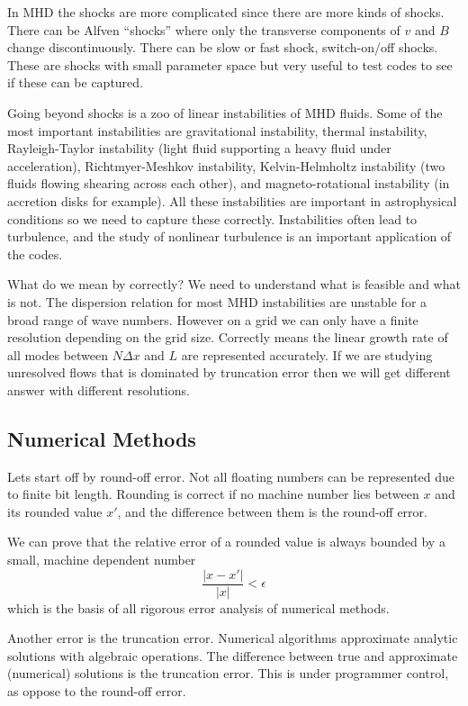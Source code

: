 \documentclass[letterpaper, 11pt]{article}
\numberwithin{equation}{section}
\numberwithin{figure}{section}
\begin{document}
In MHD the shocks are more complicated since there are more kinds of shocks.
There can be Alfven ``shocks'' where only the transverse components of $v$ and
$B$ change discontinuously. There can be slow or fast shock, switch-on/off
shocks. These are shocks with small parameter space but very useful to test
codes to see if these can be captured.

Going beyond shocks is a zoo of linear instabilities of MHD fluids. Some of the
most important instabilities are gravitational instability, thermal instability,
Rayleigh-Taylor instability (light fluid supporting a heavy fluid under
acceleration), Richtmyer-Meshkov instability, Kelvin-Helmholtz instability (two
fluids flowing shearing across each other), and magneto-rotational instability
(in accretion disks for example). All these instabilities are important in
astrophysical conditions so we need to capture these correctly. Instabilities
often lead to turbulence, and the study of nonlinear turbulence is an important
application of the codes.

What do we mean by correctly? We need to understand what is feasible and what is
not. The dispersion relation for most MHD instabilities are unstable for a broad
range of wave numbers. However on a grid we can only have a finite resolution
depending on the grid size. Correctly means the linear growth rate of all modes
between $N\Delta x$ and $L$ are represented accurately. If we are studying
unresolved flows that is dominated by truncation error then we will get
different answer with different resolutions.

\subsection{Numerical Methods}

Lets start off by round-off error. Not all floating numbers can be represented
due to finite bit length. Rounding is correct if no machine number lies between
$x$ and its rounded value $x'$, and the difference between them is the round-off
error.

We can prove that the relative error of a rounded value is always bounded by a
small, machine dependent number
\begin{equation}
  \label{eq:6}
  \frac{|x - x'|}{|x|} < \epsilon
\end{equation}
which is the basis of all rigorous error analysis of numerical methods.

Another error is the truncation error. Numerical algorithms approximate analytic
solutions with algebraic operations. The difference between true and approximate
(numerical) solutions is the truncation error. This is under programmer control,
as oppose to the round-off error.
\end{document}
